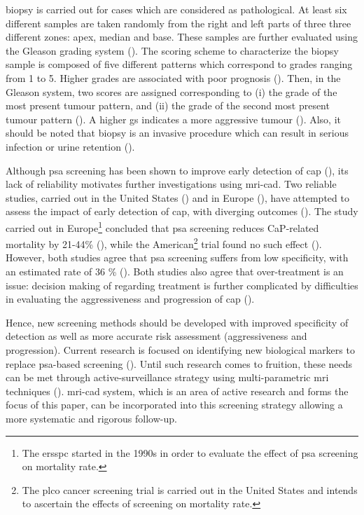  biopsy is carried out for cases which are considered as pathological. At least six different samples are taken randomly from the right and left parts of three three different zones: apex, median and base. These samples are further evaluated using the Gleason grading system (\cite{Gleason1977}). The scoring scheme to characterize the biopsy sample is composed of five different patterns which correspond to grades ranging from 1 to 5. Higher grades are associated with poor prognosis (\cite{Epstein2005}). Then, in the Gleason system, two scores are assigned corresponding to (i) the grade of the most present tumour pattern, and (ii) the grade of the second most present tumour pattern (\cite{Epstein2005}). A higher \ac{gs} indicates a more aggressive tumour (\cite{Epstein2005}). Also, it should be noted that biopsy is an invasive procedure which can result in serious infection or urine retention (\cite{Hara2005,Chou2011}).

Although \ac{psa} screening has been shown to improve early detection of \ac{cap} (\cite{Chou2011}), its lack of reliability motivates further investigations using \ac{mri}-\ac{cad}. Two reliable studies, carried out in the United States (\cite{Andriole2009}) and in Europe (\cite{Schroeder2012, Hugosson2010}), have attempted to assess the impact of early detection of \ac{cap}, with diverging outcomes (\cite{Chou2011,Heidenreich2013}). The study carried out in Europe\footnote{The \ac{ersspc}  started in the 1990s in order to evaluate the effect of \ac{psa} screening on mortality rate.} concluded that \ac{psa} screening reduces CaP-related mortality by 21-44\% (\cite{Schroeder2012, Hugosson2010}), while the American\footnote{The \ac{plco} cancer screening trial is carried out in the United States and intends to ascertain the effects of screening on mortality rate.} trial found no such effect (\cite{Andriole2009}). However, both studies agree that \ac{psa} screening suffers from low specificity, with an estimated rate of 36 \% (\cite{Schroder2008}). Both studies also agree that over-treatment is an issue: decision making of regarding treatment is further complicated by difficulties in evaluating the aggressiveness and progression of \ac{cap} (\cite{Delpierre2013}). 

Hence, new screening methods should be developed with improved specificity of detection as well as more accurate risk assessment (aggressiveness and progression). Current research is focused on identifying new biological markers to replace \ac{psa}-based screening (\cite{Bourdoumis2010,Morgan2011,Brenner2013}). Until such research comes to fruition, these needs can be met through active-surveillance strategy using multi-parametric \ac{mri} techniques (\cite{Hoeks2011,Moore2013}). \ac{mri}-\acs{cad} system, which is an area of active research and forms the focus of this paper, can be incorporated into this screening strategy allowing a more systematic and rigorous follow-up.


